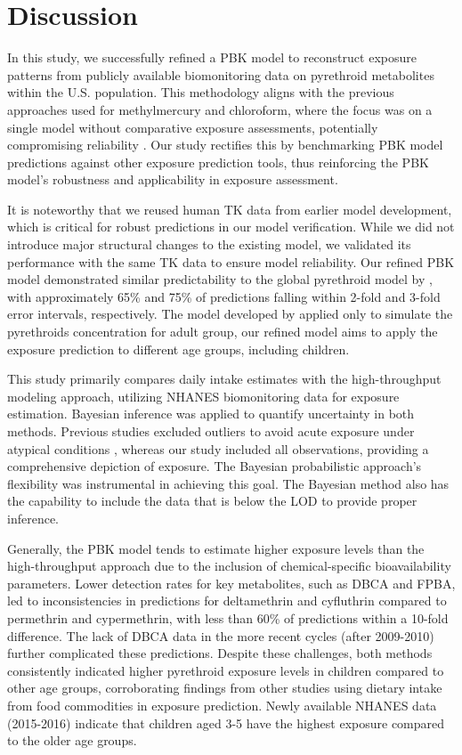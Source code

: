 \documentclass[toxics,article,submit,pdftex,moreauthors]{Definitions/mdpi}
\begin{document}
\section{Discussion}

In this study, we successfully refined a PBK model to reconstruct
exposure patterns from publicly available biomonitoring data on
pyrethroid metabolites within the U.S. population. This methodology
aligns with the previous approaches used for methylmercury and
chloroform, where the focus was on a single model without comparative
exposure assessments, potentially compromising reliability
\citep{allen2007use, lyons2008computational}. Our study rectifies this
by benchmarking PBK model predictions against other exposure prediction
tools, thus reinforcing the PBK model's robustness and applicability in
exposure assessment.

It is noteworthy that we reused human TK data from earlier model
development, which is critical for robust predictions in our model
verification. While we did not introduce major structural changes to the
existing model, we validated its performance with the same TK data to
ensure model reliability. Our refined PBK model demonstrated similar
predictability to the global pyrethroid model by
\citet{quindroit2021estimating}, with approximately 65\% and 75\% of
predictions falling within 2-fold and 3-fold error intervals,
respectively. The model developed by \citet{quindroit2021estimating}
applied only to simulate the pyrethroids concentration for adult group,
our refined model aims to apply the exposure prediction to different age
groups, including children.

This study primarily compares daily intake estimates with the
high-throughput modeling approach, utilizing NHANES biomonitoring data
for exposure estimation. Bayesian inference was applied to quantify
uncertainty in both methods. Previous studies excluded outliers to
avoid acute exposure under atypical conditions
\citep{bao2020association}, whereas our study included all observations,
providing a comprehensive depiction of exposure. The Bayesian
probabilistic approach's flexibility was instrumental in achieving this
goal. The Bayesian method also has the capability to include the data
that is below the LOD to provide proper inference.

Generally, the PBK model tends to estimate higher exposure levels than the
high-throughput approach due to the inclusion of chemical-specific
bioavailability parameters. Lower detection rates for key metabolites,
such as DBCA and FPBA, led to inconsistencies in predictions for
deltamethrin and cyfluthrin compared to permethrin and cypermethrin,
with less than 60\% of predictions within a 10-fold difference. The lack
of DBCA data in the more recent cycles (after 2009-2010) further complicated
these predictions. Despite these challenges, both methods consistently
indicated higher pyrethroid exposure levels in children compared to
other age groups, corroborating findings from other studies using
dietary intake from food commodities in exposure prediction. Newly
available NHANES data (2015-2016) indicate that children aged 3-5 have the highest
exposure compared to the older age groups.
\end{document}
